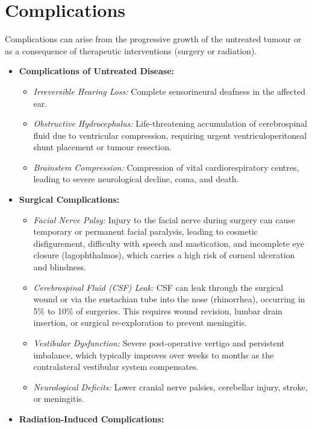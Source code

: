 \section*{Complications}
Complications can arise from the progressive growth of the untreated tumour or as a consequence of therapeutic interventions (surgery or radiation).
\begin{itemize}
    \item \textbf{Complications of Untreated Disease:}
    \begin{itemize}
        \item \textit{Irreversible Hearing Loss:} Complete sensorineural deafness in the affected ear.
        \item \textit{Obstructive Hydrocephalus:} Life-threatening accumulation of cerebrospinal fluid due to ventricular compression, requiring urgent ventriculoperitoneal shunt placement or tumour resection.
        \item \textit{Brainstem Compression:} Compression of vital cardiorespiratory centres, leading to severe neurological decline, coma, and death.
    \end{itemize}
    \item \textbf{Surgical Complications:}
    \begin{itemize}
        \item \textit{Facial Nerve Palsy:} Injury to the facial nerve during surgery can cause temporary or permanent facial paralysis, leading to cosmetic disfigurement, difficulty with speech and mastication, and incomplete eye closure (lagophthalmos), which carries a high risk of corneal ulceration and blindness.
        \item \textit{Cerebrospinal Fluid (CSF) Leak:} CSF can leak through the surgical wound or via the eustachian tube into the nose (rhinorrhea), occurring in 5\% to 10\% of surgeries. This requires wound revision, lumbar drain insertion, or surgical re-exploration to prevent meningitis.
        \item \textit{Vestibular Dysfunction:} Severe post-operative vertigo and persistent imbalance, which typically improves over weeks to months as the contralateral vestibular system compensates.
        \item \textit{Neurological Deficits:} Lower cranial nerve palsies, cerebellar injury, stroke, or meningitis.
    \end{itemize}
    \item \textbf{Radiation-Induced Complications:}
    \begin{itemize}

\end{itemize}
\end{itemize}
